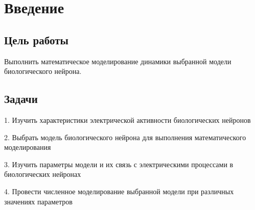 \chapter{Введение}
\label{ch:chap1}

\section{Цель работы}

Выполнить математическое моделирование динамики выбранной модели биологического нейрона.


\section{Задачи}
1. Изучить характеристики электрической активности биологических нейронов

2. Выбрать модель биологического нейрона для выполнения математического моделирования

3. Изучить параметры модели и их связь с электрическими процессами в биологических нейронах

4. Провести численное моделирование выбранной модели при различных значениях параметров




\endinput